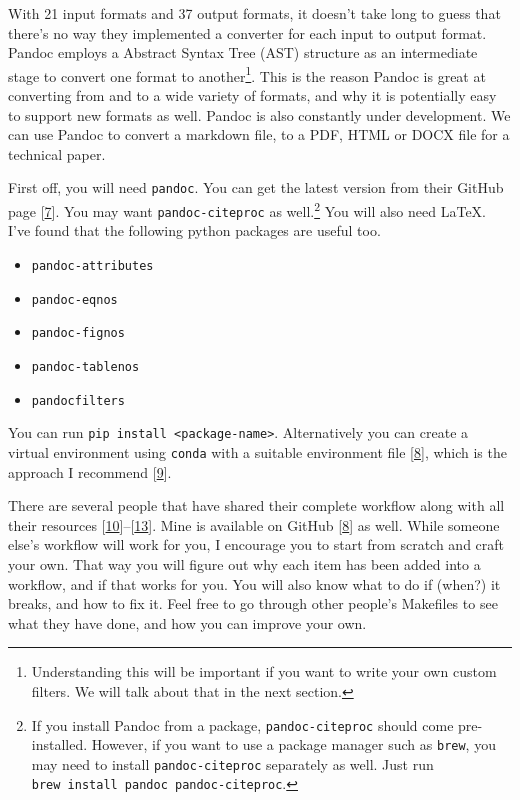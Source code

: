 \documentclass[journal,10pt,final]{IEEEtran}
\providecommand{\tightlist}{%
  \setlength{\itemsep}{0pt}\setlength{\parskip}{0pt}}
\begin{document}
With 21 input formats and 37 output formats, it doesn't take long to
guess that there's no way they implemented a converter for each input to
output format. Pandoc employs a Abstract Syntax Tree (AST) structure as
an intermediate stage to convert one format to another\footnote{Understanding
  this will be important if you want to write your own custom filters.
  We will talk about that in the next section.}. This is the reason
Pandoc is great at converting from and to a wide variety of formats, and
why it is potentially easy to support new formats as well. Pandoc is
also constantly under development. We can use Pandoc to convert a
markdown file, to a PDF, HTML or DOCX file for a technical paper.

First off, you will need \texttt{pandoc}. You can get the latest version
from their GitHub page {[}\protect\hyperlink{ref-ux5fgithub}{7}{]}. You
may want \texttt{pandoc-citeproc} as well.\footnote{If you install
  Pandoc from a package, \texttt{pandoc-citeproc} should come
  pre-installed. However, if you want to use a package manager such as
  \texttt{brew}, you may need to install \texttt{pandoc-citeproc}
  separately as well. Just run
  \texttt{brew\ install\ pandoc\ pandoc-citeproc}.} You will also need
\LaTeX. I've found that the following python packages are useful too.

\begin{itemize}
\tightlist
\item
  \texttt{pandoc-attributes}
\item
  \texttt{pandoc-eqnos}
\item
  \texttt{pandoc-fignos}
\item
  \texttt{pandoc-tablenos}
\item
  \texttt{pandocfilters}
\end{itemize}

You can run
\texttt{pip\ install\ \textless{}package-name\textgreater{}}.
Alternatively you can create a virtual environment using \texttt{conda}
with a suitable environment file
{[}\protect\hyperlink{ref-krishnamurthyux5fgithub}{8}{]}, which is the
approach I recommend
{[}\protect\hyperlink{ref-krishnamurthyux5fusing}{9}{]}.

There are several people that have shared their complete workflow along
with all their resources
{[}\protect\hyperlink{ref-healyux5fplain}{10}{]}--{[}\protect\hyperlink{ref-ux5facademic}{13}{]}.
Mine is available on GitHub
{[}\protect\hyperlink{ref-krishnamurthyux5fgithub}{8}{]} as well. While
someone else's workflow will work for you, I encourage you to start from
scratch and craft your own. That way you will figure out why each item
has been added into a workflow, and if that works for you. You will also
know what to do if (when?) it breaks, and how to fix it. Feel free to go
through other people's Makefiles to see what they have done, and how you
can improve your own.
\end{document}
